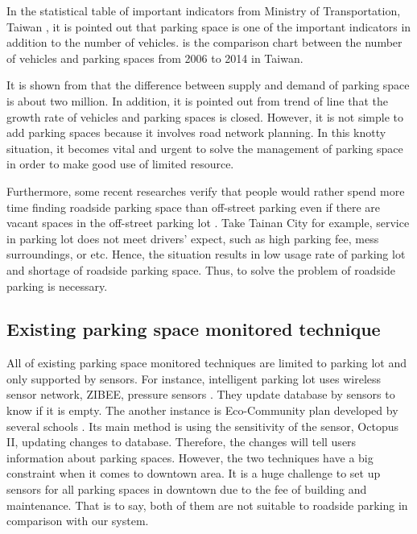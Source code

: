 \documentclass[runningheads,a4paper]{llncs}
\begin{document}
In the statistical table of important indicators from Ministry of
Transportation, Taiwan \cite{motc}, it is pointed out that parking space is one
of the important indicators in addition to the number of vehicles.
 is the comparison chart between the number of vehicles and
parking spaces from 2006 to 2014 in Taiwan.

It is shown from  that the difference between supply and demand
of parking space is about two million. In addition, it is pointed out
from trend of line that the growth rate of vehicles and parking spaces
is closed. However, it is not simple to add parking spaces because it
involves road network planning. In this knotty situation, it becomes
vital and urgent to solve the management of parking space in order to
make good use of limited resource.

Furthermore, some recent researches verify that people would rather
spend more time finding roadside parking space than off-street parking
even if there are vacant spaces in the off-street parking lot \cite{OnStreetParking}. Take
Tainan City for example, service in parking lot does not meet drivers'
expect, such as high parking fee, mess surroundings, or etc. Hence, the
situation results in low usage rate of parking lot and shortage of
roadside parking space. Thus, to solve the problem of roadside parking
is necessary.

%
\subsection{Existing parking space monitored technique}
%

All of existing parking space monitored techniques are limited to
parking lot and only supported by sensors. For instance, intelligent
parking lot uses wireless sensor network, ZIBEE, pressure sensors
\cite{PaymentSystem, IOV2015}.
They update database by sensors to know if it is empty. The another
instance is Eco-Community plan developed by several schools
\cite{EcoCommunity}. Its
main method is using the sensitivity of the sensor, Octopus II,
updating changes to database. Therefore, the changes will tell users
information about parking spaces. However, the two techniques have a big
constraint when it comes to downtown area. It is a huge challenge to set
up sensors for all parking spaces in downtown due to the fee of building
and maintenance. That is to say, both of them are not suitable to
roadside parking in comparison with our system.
\end{document}
